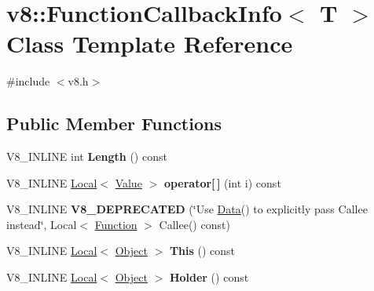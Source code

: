 \hypertarget{classv8_1_1FunctionCallbackInfo}{}\section{v8\+:\+:Function\+Callback\+Info$<$ T $>$ Class Template Reference}
\label{classv8_1_1FunctionCallbackInfo}


{\ttfamily \#include $<$v8.\+h$>$}

\subsection*{Public Member Functions}
\begin{DoxyCompactItemize}
\item 
V8\+\_\+\+I\+N\+L\+I\+NE int {\bfseries Length} () const \hypertarget{classv8_1_1FunctionCallbackInfo_ab27e070d5dca1974adcd1ff9e5482c6e}{}\label{classv8_1_1FunctionCallbackInfo_ab27e070d5dca1974adcd1ff9e5482c6e}

\item 
V8\+\_\+\+I\+N\+L\+I\+NE \hyperlink{classv8_1_1Local}{Local}$<$ \hyperlink{classv8_1_1Value}{Value} $>$ {\bfseries operator\mbox{[}$\,$\mbox{]}} (int i) const \hypertarget{classv8_1_1FunctionCallbackInfo_a0d911f2ef4a2afcb9a29fbae9e733d9b}{}\label{classv8_1_1FunctionCallbackInfo_a0d911f2ef4a2afcb9a29fbae9e733d9b}

\item 
V8\+\_\+\+I\+N\+L\+I\+NE {\bfseries V8\+\_\+\+D\+E\+P\+R\+E\+C\+A\+T\+ED} (\char`\"{}Use \hyperlink{classv8_1_1Data}{Data}() to explicitly pass Callee instead\char`\"{}, Local$<$ \hyperlink{classv8_1_1Function}{Function} $>$ Callee() const)\hypertarget{classv8_1_1FunctionCallbackInfo_ab7f9c2a3b7c47d99df6c0f700ae7c1db}{}\label{classv8_1_1FunctionCallbackInfo_ab7f9c2a3b7c47d99df6c0f700ae7c1db}

\item 
V8\+\_\+\+I\+N\+L\+I\+NE \hyperlink{classv8_1_1Local}{Local}$<$ \hyperlink{classv8_1_1Object}{Object} $>$ {\bfseries This} () const \hypertarget{classv8_1_1FunctionCallbackInfo_a14c7f2df117ad879df898f8451a3fa38}{}\label{classv8_1_1FunctionCallbackInfo_a14c7f2df117ad879df898f8451a3fa38}

\item 
V8\+\_\+\+I\+N\+L\+I\+NE \hyperlink{classv8_1_1Local}{Local}$<$ \hyperlink{classv8_1_1Object}{Object} $>$ {\bfseries Holder} () const \hypertarget{classv8_1_1FunctionCallbackInfo_a5b080ddb61501773dfd32058b26a5238}{}\label{classv8_1_1FunctionCallbackInfo_a5b080ddb61501773dfd32058b26a5238}


\end{DoxyCompactItemize}

